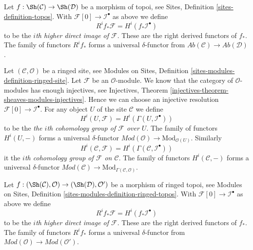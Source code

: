 \medskip\noindent
Let $f : \Sh(\mathcal{C}) \to \Sh(\mathcal{D})$ be a morphism of topoi, see
Sites, Definition \ref{sites-definition-topos}.
With $\mathcal{F}[0] \to \mathcal{I}^\bullet$ as above
we define
\begin{equation}
\label{equation-higher-direct-image}
R^if_*\mathcal{F} = H^i(f_*\mathcal{I}^\bullet)
\end{equation}
to be the {\it $i$th higher direct image of $\mathcal{F}$}.
These are the right derived functors of $f_*$.
The family of functors $R^if_*$ forms a universal $\delta$-functor
from $\textit{Ab}(\mathcal{C}) \to \textit{Ab}(\mathcal{D})$.

\medskip\noindent
Let $(\mathcal{C}, \mathcal{O})$ be a ringed site, see
Modules on Sites, Definition \ref{sites-modules-definition-ringed-site}.
Let $\mathcal{F}$ be an $\mathcal{O}$-module.
We know that the category of $\mathcal{O}$-modules
has enough injectives, see
Injectives, Theorem \ref{injectives-theorem-sheaves-modules-injectives}.
Hence we can choose an injective resolution
$\mathcal{F}[0] \to \mathcal{I}^\bullet$.
For any object $U$ of the site $\mathcal{C}$ we define
\begin{equation}
\label{equation-cohomology-object-site-modules}
H^i(U, \mathcal{F}) = H^i(\Gamma(U, \mathcal{I}^\bullet))
\end{equation}
to be the {\it the $i$th cohomology group of $\mathcal{F}$ over $U$}.
The family of functors $H^i(U, -)$ forms a universal $\delta$-functor
$\textit{Mod}(\mathcal{O}) \to \text{Mod}_{\mathcal{O}(U)}$. Similarly
\begin{equation}
\label{equation-cohomology-modules}
H^i(\mathcal{C}, \mathcal{F}) = H^i(\Gamma(\mathcal{C}, \mathcal{I}^\bullet))
\end{equation}
it the {\it $i$th cohomology group of $\mathcal{F}$ on $\mathcal{C}$}.
The family of functors $H^i(\mathcal{C}, -)$ forms a universal
$\delta$-functor
$\textit{Mod}(\mathcal{C}) \to \text{Mod}_{\Gamma(\mathcal{C}, \mathcal{O})}$.

\medskip\noindent
Let $f : (\Sh(\mathcal{C}), \mathcal{O}) \to (\Sh(\mathcal{D}), \mathcal{O}')$
be a morphism of ringed topoi, see
Modules on Sites, Definition \ref{sites-modules-definition-ringed-topos}.
With $\mathcal{F}[0] \to \mathcal{I}^\bullet$ as above
we define
\begin{equation}
\label{equation-higher-direct-image-modules}
R^if_*\mathcal{F} = H^i(f_*\mathcal{I}^\bullet)
\end{equation}
to be the {\it $i$th higher direct image of $\mathcal{F}$}.
These are the right derived functors of $f_*$.
The family of functors $R^if_*$ forms a universal $\delta$-functor
from $\textit{Mod}(\mathcal{O}) \to \textit{Mod}(\mathcal{O}')$.

